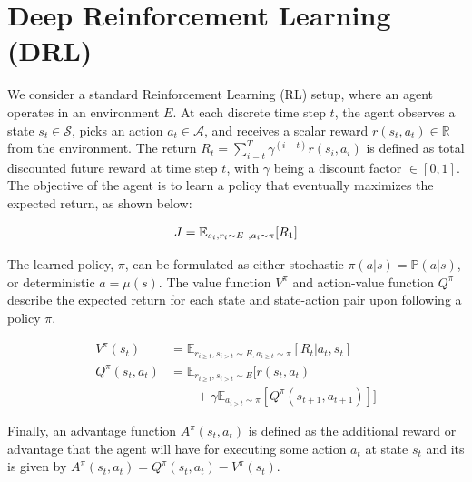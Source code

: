 \documentclass[../thesis.tex]{subfiles}
\begin{document}



\section{Deep Reinforcement Learning (DRL)} 


We consider a standard Reinforcement Learning (RL) setup, where an agent operates in an environment ${E}$. At each discrete time step $t$, the agent observes a state $s_t \in \mathcal{S}$, picks an action $a_t \in \mathcal{A}$, and receives a scalar reward $r(s_t, a_t) \in \mathbb{R}$ from the environment. The return $R_t = \sum^T_{i=t} \gamma^{(i-t)}r(s_i,a_i)$ is defined as total discounted future reward at time step $t$, with $\gamma$ being a discount factor $\in [0,1]$. The objective of the agent is to learn a policy that eventually maximizes the expected return, as shown below:

\begin{align}
\centering
J = \mathbb{E}_{s_i, r_i \sim E~, a_i \sim \pi}[R_1] \label{equ:obj-func} 
\end{align}

The learned policy, $\pi$, can be formulated as either stochastic $\pi(a|s) = \mathbb{P}(a|s)$, or deterministic $a = \mu(s)$. The value function $V^{\pi}$ and action-value function $Q^{\pi}$ describe the expected return for each state and state-action pair upon following a policy $\pi$. 

\begin{align}
V^\pi(s_t) &= \mathbb{E}_{r_{i \geq t}, s_{i > t} \sim E, a_{i \geq t} \sim \pi} [R_t | a_t, s_t] \\
Q^\pi(s_t, a_t) &= \mathbb{E}_{r_{i \geq t}, s_{i > t} \sim E} [r(s_t, a_t) \nonumber \\
&\qquad + \gamma \mathbb{E}_{a_{i > t} \sim \pi} [Q^\pi(s_{t+1}, a_{t+1})]]
\end{align}

Finally, an advantage function $A^{\pi}(s_t,a_t)$ is defined as the additional reward or advantage that the agent will have for executing some action $a_t$ at state $s_t$ and its is given by $A^{\pi}(s_t,a_t) = Q^\pi(s_t, a_t) - V^\pi(s_t)$. 
\end{document}
